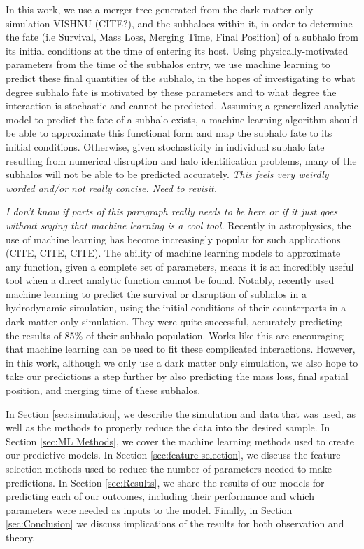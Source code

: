 \documentclass[fleqn,usenatbib]{mnras}
\begin{document}
In this work, we use a merger tree generated from the dark matter only simulation VISHNU (CITE?), and the subhaloes within it, in order to determine the fate (i.e Survival, Mass Loss, Merging Time, Final Position) of a subhalo from its initial conditions at the time of entering its host. Using physically-motivated parameters from the time of the subhalos entry, we use machine learning to predict these final quantities of the subhalo, in the hopes of investigating to what degree subhalo fate is motivated by these parameters and to what degree the interaction is stochastic and cannot be predicted. Assuming a generalized analytic model to predict the fate of a subhalo exists, a machine learning algorithm should be able to approximate this functional form and map the subhalo fate to its initial conditions. Otherwise, given stochasticity in individual subhalo fate resulting from numerical disruption and halo identification problems, many of the subhalos will not be able to be predicted accurately. \textit{This feels very weirdly worded and/or not really concise. Need to revisit.}

\textit{I don't know if parts of this paragraph really needs to be here or if it just goes without saying that machine learning is a cool tool.} Recently in astrophysics, the use of machine learning has become increasingly popular for such applications (CITE, CITE, CITE). The ability of machine learning models to approximate any function, given a complete set of parameters, means it is an incredibly useful tool when a direct analytic function cannot be found. Notably, \citet{Nadler2017} recently used machine learning to predict the survival or disruption of subhalos in a hydrodynamic simulation, using the initial conditions of their counterparts in a dark matter only simulation. They were quite successful, accurately predicting the results of 85\% of their subhalo population. Works like this are encouraging that machine learning can be used to fit these complicated interactions. However, in this work, although we only use a dark matter only simulation, we also hope to take our predictions a step further by also predicting the mass loss, final spatial position, and merging time of these subhalos.

In Section \ref{sec:simulation}, we describe the simulation and data that was used, as well as the methods to properly reduce the data into the desired sample. In Section \ref{sec:ML Methods}, we cover the machine learning methods used to create our predictive models. In Section \ref{sec:feature selection}, we discuss the feature selection methods used to reduce the number of parameters needed to make predictions. In Section \ref{sec:Results}, we share the results of our models for predicting each of our outcomes, including their performance and which parameters were needed as inputs to the model. Finally, in Section \ref{sec:Conclusion} we discuss implications of the results for both observation and theory.
\end{document}
